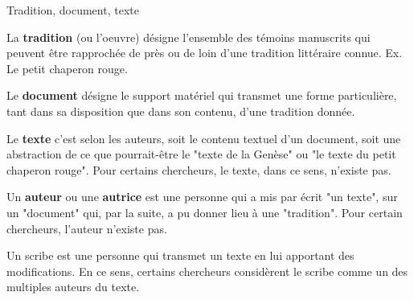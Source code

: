 \documentclass[11pt]{beamer}
\begin{document}
\begin{frame}{Tradition, document, texte}

\begin{definition}
    La \textbf{tradition} (ou l'oeuvre) désigne l'ensemble des témoins manuscrits qui peuvent être rapprochée de près ou de loin d'une tradition littéraire connue. Ex. Le petit chaperon rouge. 
\end{definition}

\begin{definition}
    Le \textbf{document} désigne le support matériel qui transmet une forme particulière, tant dans sa disposition que dans son contenu, d'une tradition donnée. 
\end{definition}

\begin{definition}
    Le \textbf{texte} c'est selon les auteurs, soit le contenu textuel d'un document, soit une abstraction de ce que pourrait-être le "texte de la Genèse" ou "le texte du petit chaperon rouge". Pour certains chercheurs, le texte, dans ce sens, n'existe pas. 
\end{definition}

\begin{definition}
    Un \textbf{auteur} ou une \textbf{autrice} est une personne qui a mis par écrit "un texte", sur un "document" qui, par la suite, a pu donner lieu à une "tradition". Pour certain chercheurs, l'auteur n'existe pas.
\end{definition}

\begin{definition}
    Un scribe est une personne qui transmet un texte en lui apportant des modifications. En ce sens, certains chercheurs considèrent le scribe comme un des multiples auteurs du texte.
\end{definition}
    
\end{frame}
\end{document}
